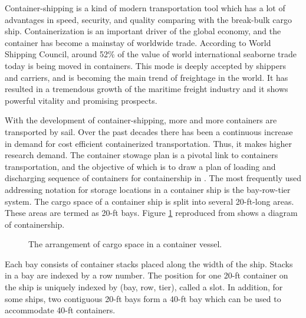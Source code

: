 \documentclass[review,3p,times,authoryear,12pt]{elsarticle}
\begin{document}
Container-shipping is a kind of modern transportation tool which has a lot of advantages in speed, security, and quality comparing with the break-bulk cargo ship.
Containerization is an important driver of the global economy, and the container has become a mainstay of worldwide trade.
According to World Shipping Council, around 52\% of the value of world international seaborne trade today is being moved in containers.
This mode is deeply accepted by shippers and carriers, and is becoming the main trend of freightage in the world.
It has resulted in a tremendous growth of the maritime freight industry and it shows powerful vitality and promising prospects.

With the development of container-shipping, more and more containers are transported by sail.
Over the past decades there has been a continuous increase in demand for cost efficient containerized transportation.
Thus, it makes higher research demand.
The container stowage plan is a pivotal link to containers transportation, and the objective of which is to draw a plan of loading and discharging sequence of containers for containership in \cite{zhang2008review}.
The most frequently used addressing notation for storage locations in a container ship is the bay-row-tier system.
The cargo space of a container ship is split into several 20-ft-long areas.
These areas are termed as 20-ft bays. Figure \ref{fig 1:graph} reproduced from \cite{delgado2012constraint} shows a diagram of containership.
\begin{figure}[htbp]
\center
\setlength{\abovecaptionskip}{10pt}
\caption{The arrangement of cargo space in a container vessel.}
\label{fig 1:graph}
\end{figure}

Each bay consists of container stacks placed along the width of the ship.
Stacks in a bay are indexed by a row number.
The position for one 20-ft container on the ship is uniquely indexed by (bay, row, tier), called a slot.
In addition, for some ships, two contiguous 20-ft bays form a 40-ft bay which can be used to accommodate 40-ft containers.
\end{document}

